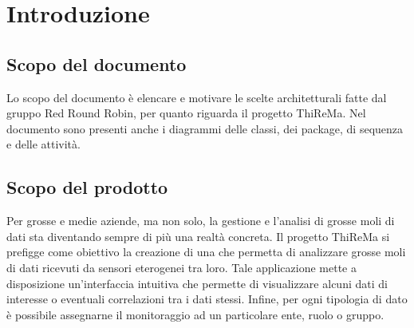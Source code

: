 \section{Introduzione}
	\subsection{Scopo del documento}
		Lo scopo del documento è elencare e motivare le scelte architetturali fatte dal gruppo Red Round Robin, per quanto riguarda il progetto ThiReMa. Nel documento sono presenti anche i diagrammi delle classi, dei package, di sequenza e delle attività.
	\subsection{Scopo del prodotto}
	 	Per grosse e medie aziende, ma non solo, la gestione e l'analisi di grosse moli di dati sta diventando sempre di più una realtà concreta.
		Il progetto ThiReMa si prefigge come obiettivo la creazione di una  che permetta di analizzare grosse moli di dati ricevuti da sensori eterogenei tra loro. Tale applicazione mette a disposizione un'interfaccia intuitiva che permette di visualizzare alcuni dati di interesse o eventuali correlazioni tra i dati stessi. Infine, per ogni tipologia di dato è possibile assegnarne il monitoraggio ad un particolare ente, ruolo o gruppo.
	